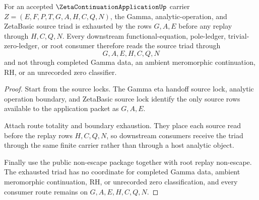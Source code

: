 \begin{theorem}
\label{thm:zeta-continuation-application-source-triad-exhaustion}
For an accepted $\ZetaContinuationApplicationUp$ carrier
$Z=(E,F,P,T,G,A,H,C,Q,N)$, the Gamma, analytic-operation, and ZetaBasic source
triad is exhausted by the rows $G,A,E$ before any replay through $H,C,Q,N$.
Every downstream functional-equation, pole-ledger, trivial-zero-ledger, or root
consumer therefore reads the source triad through
$$
G,A,E,H,C,Q,N
$$
and not through completed Gamma data, an ambient meromorphic continuation, RH,
or an unrecorded zero classifier.
\end{theorem}
\begin{proof}
Start from the source locks. The Gamma eta handoff source lock, analytic
operation boundary, and ZetaBasic source lock identify the only source rows
available to the application packet as $G,A,E$.

Attach route totality and boundary exhaustion. They place each source read
before the replay rows $H,C,Q,N$, so downstream consumers receive the triad
through the same finite carrier rather than through a host analytic object.

Finally use the public non-escape package together with root replay non-escape.
The exhausted triad has no coordinate for completed Gamma data, ambient
meromorphic continuation, RH, or unrecorded zero classification, and every
consumer route remains on $G,A,E,H,C,Q,N$.
\end{proof}


